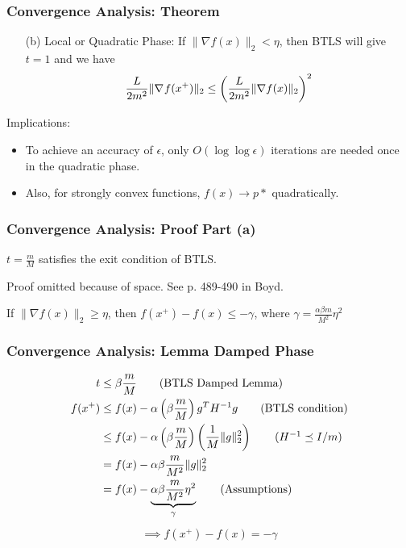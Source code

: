 \documentclass{beamer}
\newcommand{\be}{\begin{eqnarray}}
\newcommand{\ee}{\end{eqnarray}}
\begin{document}
\begin{frame}
    \frametitle{Convergence Analysis: Theorem}    
    \begin{theorem}[Part II]
        \begin{itemize}
            \item[(b)] Local or Quadratic Phase: If $\|\nabla f(x)\|_2 < \eta$,
                then BTLS will give $t = 1$ and we have
                \be
                \frac{L}{2m^2} \|\gradient{}{f}{x^{+}}\|_2 \leq 
                    \bigg(\frac{L}{2m^2} \|\nabla f(x)\|_2 \bigg)^2
                \ee
        \end{itemize}
    \end{theorem}
    Implications:
    \begin{itemize}
    \item To achieve an accuracy of $\epsilon$, only $O(\log \log \epsilon)$ iterations are needed once in the quadratic phase.
    \item Also, for strongly convex functions, $f(x) \to p*$ quadratically.
    \end{itemize}
\end{frame}

\begin{frame}
    \frametitle{Convergence Analysis: Proof Part (a)}    
    \begin{lemma}
        $t = \frac{m}{M}$ satisfies the exit condition of BTLS.
    \end{lemma}
    Proof omitted because of space.  See p. 489-490 in Boyd.
    \begin{lemma}
        If $\|\nabla f(x)\|_2 \geq \eta$, 
        then $f(x^{+}) - f(x) \leq -\gamma$, 
        where  $\gamma = \frac{\alpha \beta m}{M^2}\eta^2$
    \end{lemma}
\end{frame}

\begin{frame}
    \frametitle{Convergence Analysis: Lemma Damped Phase}    
	\begin{align}
	t &\leq \beta \frac{m}{M} \tag{BTLS Damped Lemma} \\
	f(x^+) &\leq f(x) - \alpha\left(\beta \frac{m}{M} \right) g^T H^{-1} g \tag{BTLS condition} \\
	&\leq f(x) - \alpha\left(\beta \frac{m}{M} \right) \left(\frac{1}{M}\|g\|_2^2 \right) \tag{$H^{-1} \preceq I/m$} \\
	&= f(x) - \alpha\beta \frac{m}{M^2}\|g\|_2^2 \notag \\
	&= f(x) - \underbrace{\alpha\beta \frac{m}{M^2} \eta^2}_{\gamma} \tag{Assumptions}
	\end{align}  
	\begin{align}
	\implies f(x^+) - f(x) = - \gamma
	\end{align}
\end{frame}
\end{document}
